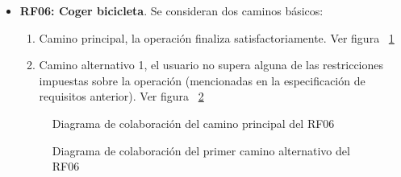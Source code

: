 \begin{itemize}
	\FloatBarrier
	\item \textbf{RF06: Coger bicicleta}. Se consideran dos caminos básicos: 
	\begin{enumerate}
		\item Camino principal, la operación finaliza satisfactoriamente. Ver figura ~\ref{fig:diagramaColaboracion_RF06_1}
		\item Camino alternativo 1, el usuario no supera alguna de las restricciones impuestas sobre la operación (mencionadas en la especificación de requisitos anterior). Ver figura ~\ref{fig:diagramaColaboracion_RF06_2}
	\end{enumerate}
	\begin{figure} [!htb]
		\centering
		\caption{Diagrama de colaboración del camino principal del RF06}
		\label{fig:diagramaColaboracion_RF06_1}
	\end{figure}
	\begin{figure} [!htb]
		\centering
		\caption{Diagrama de colaboración del primer camino alternativo del RF06}
		\label{fig:diagramaColaboracion_RF06_2}
	\end{figure}
	

\end{itemize}
